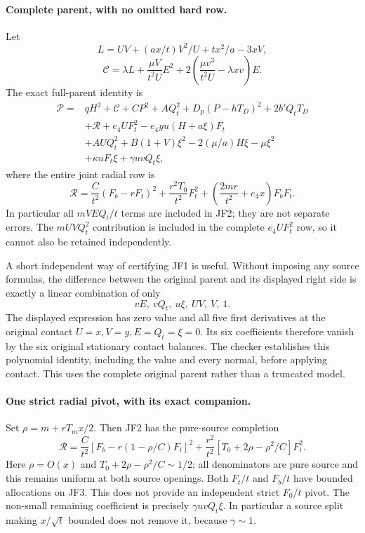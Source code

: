 \paragraph{Complete parent, with no omitted hard row.}
Let
\[
 L=UV+(ax/t)V^2/U+tx^2/a-3xV,
\]
\[
 \mathscr C=\lambda L+\frac{\mu V}{t^2U}E^2
                +2\left(\frac{\mu v^3}{t^2U}-\lambda xv\right)E.
\]
The exact full-parent identity is
\begin{align*}
 \mathcal P={}&qH^2+\mathscr C
 +CP^2+AQ_t^2+D_p(P-hT_D)^2+2b'Q_tT_D\\
 &+\mathscr R+e_4UF_t^2-e_4yu(H+a\xi)F_t\\
 &+AUQ_t^2+B(1+V)\xi^2
                 -2(\mu/a)H\xi-\mu\xi^2\\
 &+\kappa uF_t\xi+\gamma uvQ_t\xi,                 \tag{JF1}
\end{align*}
where the entire joint radial row is
\[
 \mathscr R=\frac C{t^2}(F_b-rF_t)^2
       +\frac{r^2T_0}{t^2}F_t^2
       +\left(\frac{2mr}{t^2}+e_4x\right)F_bF_t.    \tag{JF2}
\]
In particular all $mVEQ_t/t$ terms are included in JF2; they are not
separate errors. The $mUVQ_t^2$ contribution is included in the complete
$e_4UF_t^2$ row, so it cannot also be retained independently.

A short independent way of certifying JF1 is useful. Without imposing
any source formulas, the difference between the original parent and
its displayed right side is exactly a linear combination of only
\[
                       vE,\ vQ_t,\ u\xi,\ UV,\ V,\ 1.
\]
The displayed expression has zero value and all five first derivatives
at the original contact $U=x,V=y,E=Q_t=\xi=0$.
Its six coefficients therefore vanish by the six original stationary
contact balances. The checker establishes this polynomial identity,
including the value and every normal, before applying contact. This
uses the complete original parent rather than a truncated model.

\paragraph{One strict radial pivot, with its exact companion.}
Set $\rho=m+rT_mx/2$. Then JF2 has the pure-source completion
\[
 \mathscr R=\frac C{t^2}
       [F_b-r(1-\rho/C)F_t]^2
       +\frac{r^2}{t^2}[T_0+2\rho-\rho^2/C]F_t^2.  \tag{JF3}
\]
Here $\rho=O(x)$ and $T_0+2\rho-\rho^2/C\sim1/2$;
all denominators are pure source and this remains uniform at both
source openings. Both $F_t/t$ and $F_b/t$ have bounded allocations
on JF3. This does not provide an independent strict $F_0/t$ pivot.
The non-small remaining coefficient is precisely $\gamma uvQ_t\xi$.
In particular a source split making $x/\sqrt t$ bounded does not
remove it, because $\gamma\sim1$.

